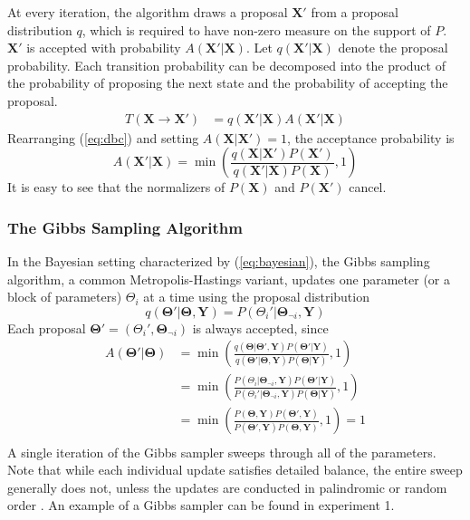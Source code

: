 \documentclass[a4paper,11pt]{article}
\begin{document}
At every iteration, the algorithm draws a proposal $\mathbf{X}'$ from a proposal distribution $q$, which is required to have non-zero measure on the support of $P$. $\mathbf{X}'$ is accepted with probability $A(\mathbf{X}'|\mathbf{X})$. Let $q(\mathbf{X}'|\mathbf{X})$ denote the proposal probability. Each transition probability can be decomposed into the product of the probability of proposing the next state and the probability of accepting the proposal.
\begin{align*}
    T(\mathbf{X} \rightarrow \mathbf{X}') &= q(\mathbf{X}'|\mathbf{X}) A(\mathbf{X}'|\mathbf{X})
\end{align*}
Rearranging (\ref{eq:dbc}) and setting  $A(\mathbf{X}|\mathbf{X}')=1$, the acceptance probability is
\begin{equation}
    A(\mathbf{X}'|\mathbf{X}) = \min{\left(\frac{q(\mathbf{X}|\mathbf{X}')  P(\mathbf{X}') }{q(\mathbf{X}'|\mathbf{X})  P(\mathbf{X})}, 1\right)}
    \label{eq:mh_acceptance}
\end{equation}
It is easy to see that the normalizers of $P(\mathbf{X})$ and $P(\mathbf{X}')$ cancel.

\subsubsection{The Gibbs Sampling Algorithm}
In the Bayesian setting characterized by (\ref{eq:bayesian}), the Gibbs sampling algorithm, a common Metropolis-Hastings variant, updates one parameter (or a block of parameters) $\Theta_{i}$ at a time using the proposal distribution
\begin{equation}
    q(\mathbf{\Theta}'|\mathbf{\Theta}, \mathbf{Y}) = P(\Theta_{i}' | \mathbf{\Theta}_{\neg i}, \mathbf{Y})
\end{equation}
Each proposal $\mathbf{\Theta}' = (\Theta_{i}', \mathbf{\Theta}_{\neg i}) $ is always accepted, since
\begin{equation}
    \begin{aligned}
    A(\mathbf{\Theta}'|\mathbf{\Theta}) &= \min{\left(\frac{q(\mathbf{\Theta}|\mathbf{\Theta}', \mathbf{Y})  P(\mathbf{\Theta}'|\mathbf{Y}) }{q(\mathbf{\Theta}'|\mathbf{\Theta}, \mathbf{Y})  P(\mathbf{\Theta}| \mathbf{Y})}, 1\right)} \\
    &= \min{\left(\frac{P(\Theta_{i} | \mathbf{\Theta}_{\neg i}, \mathbf{Y})  P(\mathbf{\Theta}'|\mathbf{Y}) }{P(\Theta_{i}' | \mathbf{\Theta}_{\neg i}, \mathbf{Y})  P(\mathbf{\Theta}| \mathbf{Y})}, 1\right)} \\
    &= \min{\left(\frac{P(\mathbf{\Theta}, \mathbf{Y})  P(\mathbf{\Theta}', \mathbf{Y}) }{P(\mathbf{\Theta}', \mathbf{Y})  P(\mathbf{\Theta}, \mathbf{Y})}, 1\right)} = 1 \\
    \end{aligned}
\end{equation}
A single iteration of the Gibbs sampler sweeps through all of the parameters. Note that while each individual update satisfies detailed balance, the entire sweep generally does not, unless the updates are conducted in palindromic or random order \cite{geyer_practical_1992}. An example of a Gibbs sampler can be found in experiment 1.
\end{document}
